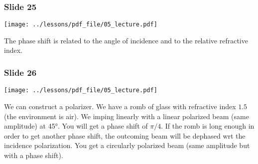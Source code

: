 \documentclass[../main/main.tex]{subfiles}
\begin{document}
\subsubsection*{Slide 25}

\begin{minipage}[]{0.5\linewidth}
\centering
\texttt{[image: ../lessons/pdf\_file/05\_lecture.pdf]}
\end{minipage}
\hspace{0.3cm}\vspace{0.3cm}
\begin{minipage}[c]{0.47\linewidth}

The phase shift is related to the angle of incidence and to the relative refractive index.

\end{minipage}


\subsubsection*{Slide 26}

\begin{minipage}[]{0.5\linewidth}
\centering
\texttt{[image: ../lessons/pdf\_file/05\_lecture.pdf]}
\end{minipage}
\hspace{0.3cm}\vspace{0.3cm}
\begin{minipage}[c]{0.47\linewidth}

We can construct a polarizer. We have a romb of glass with refractive index \( 1.5 \) (the environment is air). We imping linearly with a linear polarized beam (same amplitude) at 45°. You will get a phase shift of \( \pi/4 \). If the romb is long enough in order to get another phase shift, the outcoming beam will be dephased wrt the incidence polarization. You get a circularly polarized beam (same amplitude but with a phase shift).


\end{minipage}
\end{document}
